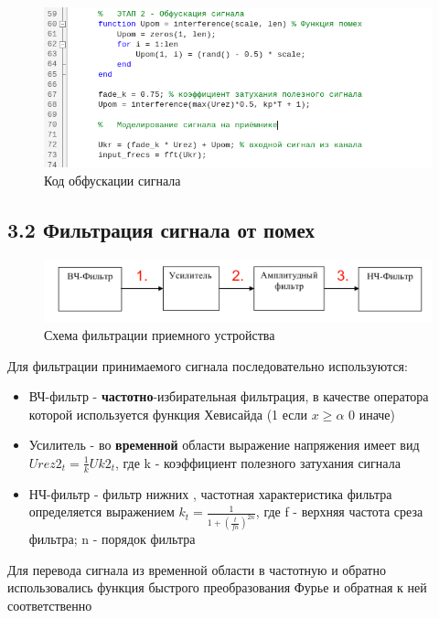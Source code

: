 \documentclass[12pt]{article}
\begin{document}
  	\begin{figure}[!h]
		\centering
		\includegraphics[width=\linewidth]{code_channel_sig.png}
		\caption{Код обфускации сигнала}
	\end{figure}
  
 
  \subsection*{3.2 Фильтрация сигнала от помех}
  	\begin{figure}[!h]
		\centering
		\includegraphics[width=1\linewidth]{filtering_scheme_colored.png}
		\caption{Схема фильтрации приемного устройства}
	\end{figure}
	
	Для фильтрации принимаемого сигнала последовательно используются:\\
	\begin{itemize}
		\item ВЧ-фильтр - \textbf{частотно}-избирательная фильтрация, в качестве оператора которой используется функция Хевисайда (1 если $x \geq \alpha$ 0 иначе)
		\item Усилитель - во \textbf{временной} области выражение напряжения имеет вид $Urez2_t = \frac{1}{k}Uk2_t$, где k - коэффициент полезного затухания сигнала
		\item НЧ-фильтр - фильтр нижних , частотная характеристика фильтра определяется выражением $k_t = \frac{1}{1+(\frac{t}{fn})^{2n}}$, где f - верхняя частота среза фильтра; n - порядок фильтра
	\end{itemize}
	
	Для перевода сигнала из временной области в частотную и обратно использовались функция быстрого преобразования Фурье и обратная к ней соответственно
	
\end{document}
